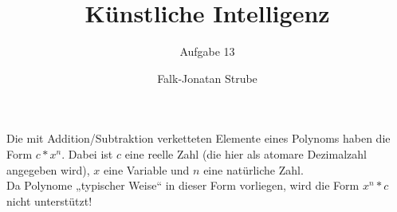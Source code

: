 \documentclass{scrreprt}
\title{Künstliche Intelligenz}
\subtitle{Aufgabe 13}
\author{Falk-Jonatan Strube}
\begin{document}
\maketitle

\noindent{}Die mit Addition/Subtraktion verketteten Elemente eines Polynoms haben die Form $c*x^n$. Dabei ist $c$ eine reelle Zahl (die hier als atomare Dezimalzahl angegeben wird), $x$ eine Variable und $n$ eine natürliche Zahl.\\
Da Polynome „typischer Weise“ in dieser Form vorliegen, wird die Form $x^n*c$ nicht unterstützt!


\end{document}
